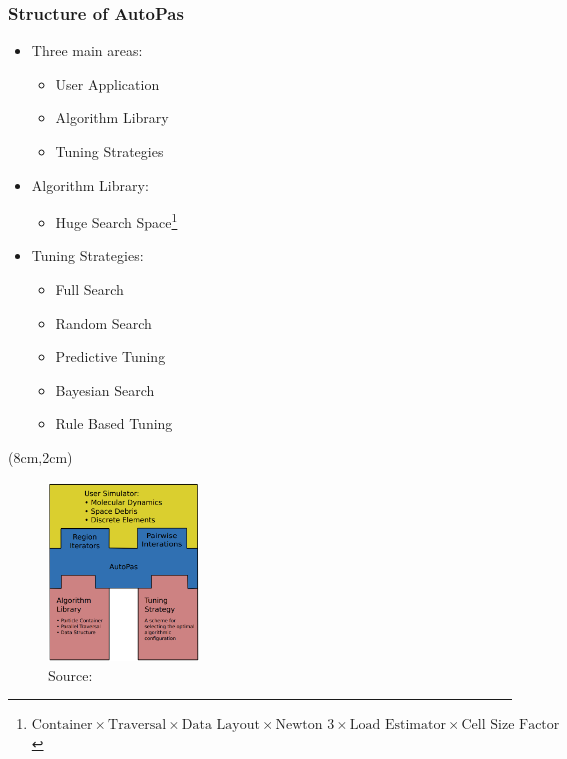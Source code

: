\documentclass[
	10pt,
	t		%
]{beamer}
\begin{document}
\begin{frame}
	\frametitle{Structure of AutoPas}
	
	\begin{itemize}
		\item Three main areas:
		      \begin{itemize}
			      \item User Application
			      \item Algorithm Library
			      \item Tuning Strategies
		      \end{itemize}
		\item Algorithm Library:
		      \begin{itemize}
			      \item Huge Search Space\footnote{\scriptsize{$\text{Container}\times\text{Traversal} \times \text{Data Layout} \times \text{Newton 3} \times \text{Load Estimator} \times \text{Cell Size Factor}$}
			            }
		      \end{itemize}
		\item Tuning Strategies:
		      \begin{itemize}
			      \item Full Search
			      \item Random Search
			      \item Predictive Tuning
			      \item Bayesian Search
			      \item Rule Based Tuning
		      \end{itemize}
	\end{itemize}
	
	\begin{textblock*}{4cm}(8cm,2cm)
		\begin{figure}
			\includegraphics[width=4cm]{figures/AutoPasLibraryStructure.png}
			\caption{ \footnotesize{Source: \cite{Newcome2023Poster}}}
			
		\end{figure}
	\end{textblock*}
\end{frame}
\end{document}
